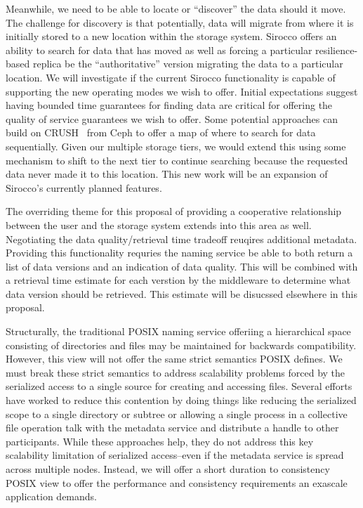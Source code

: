 Meanwhile, we need to be able to locate or ``discover'' the data should it
move.  The challenge for discovery is that potentially, data will migrate from
where it is initially stored to a new location within the storage system.
Sirocco offers an ability to search for data that has moved as well as forcing
a particular resilience-based replica be the ``authoritative'' version
migrating the data to a particular location. We will investigate if the current
Sirocco functionality is capable of supporting the new operating modes we wish
to offer. Initial expectations suggest having bounded time guarantees for
finding data are critical for offering the quality of service guarantees we
wish to offer. Some potential approaches can build on CRUSH~\cite{ceph} from
Ceph to offer a map of where to search for data sequentially. Given our
multiple storage tiers, we would extend this using some mechanism to shift to
the next tier to continue searching because the requested data never made it to
this location. This new work will be an expansion of Sirocco's currently
planned features.

The overriding theme for this proposal of providing a cooperative relationship
between the user and the storage system extends into this area as well.
Negotiating the data quality/retrieval time tradeoff reuqires additional
metadata.  Providing this functionality requries the naming service be able to
both return a list of data versions and an indication of data quality. This
will be combined with a retrieval time estimate for each verstion by the
middleware to determine what data version should be retrieved.  This estimate
will be disucssed elsewhere in this proposal.

Structurally, the traditional POSIX naming service offeriing a hierarchical
space consisting of directories and files may be maintained for backwards
compatibility. However, this view will not offer the same strict semantics
POSIX defines. We must break these strict semantics to address scalability
problems forced by the serialized access to a single source for creating and
accessing files.  Several efforts~\cite{giga+,pvfs,others} have worked to
reduce this contention by doing things like reducing the serialized scope to a
single directory or subtree or allowing a single process in a collective file
operation talk with the metadata service and distribute a handle to other
participants. While these approaches help, they do not address this key
scalability limitation of serialized access--even if the metadata service is
spread across multiple nodes. Instead, we will offer a short duration to
consistency POSIX view to offer the performance and consistency requirements an
exascale application demands.

